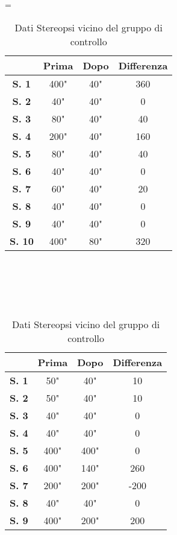 

\begin{table}[H]
\centering
\setlength\tabcolsep{4pt}
\begin{minipage}{0.48\textwidth}
\centering
\tablewidth=\textwidth

\begin{tabular}{|c|c|c|c|} \hline
{\textbf{}} & {\textbf{Prima}} & {\textbf{Dopo}}& {\textbf{Differenza}} \\ \hline
\textbf{S. 1} & 400" & 40" & 360 \\ \hline
\textbf{S. 2} & 40" & 40" & 0 \\ \hline
\textbf{S. 3} & 80" & 40" & 40 \\ \hline
\textbf{S. 4} & 200" & 40" & 160 \\ \hline
\textbf{S. 5} & 80" & 40" & 40 \\ \hline
\textbf{S. 6} & 40" & 40" & 0 \\ \hline
\textbf{S. 7} & 60" & 40" & 20 \\ \hline
\textbf{S. 8} & 40" & 40" & 0 \\ \hline
\textbf{S. 9} & 40" & 40" & 0 \\ \hline
\textbf{S. 10} & 400" & 80" & 320 \\ \hline
\end{tabular} 
\caption{Dati Stereopsi vicino del gruppo sperimentale}

\label{tab:accuracy} 
\end{minipage}%
\hfill
\begin{minipage}{0.48\textwidth}
\centering

\\\ \\\ \\\ 

\begin{tabular}{|c|c|c|c|} \hline
{\textbf{}} & {\textbf{Prima}} & {\textbf{Dopo}}& {\textbf{Differenza}} \\ \hline
\textbf{S. 1} & 50" & 40" & 10 \\ \hline
\textbf{S. 2} & 50" & 40" & 10 \\ \hline
\textbf{S. 3} & 40" & 40" & 0 \\ \hline
\textbf{S. 4} & 40" & 40" & 0 \\ \hline
\textbf{S. 5} & 400" & 400" & 0 \\ \hline
\textbf{S. 6} & 400" & 140" & 260 \\ \hline
\textbf{S. 7} & 200" & 200" & -200\\ \hline
\textbf{S. 8} & 40" & 40" & 0 \\ \hline
\textbf{S. 9} & 400" & 200" & 200 \\ \hline
\end{tabular} 
\caption{Dati Stereopsi vicino del gruppo di controllo}

 \label{tab:ompdiff} 
\end{minipage}
\end{table}




